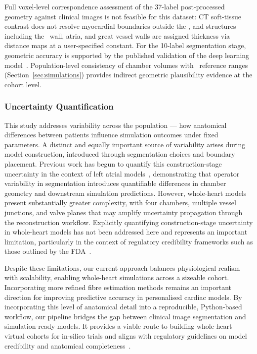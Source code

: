 Full voxel-level correspondence assessment of the 37-label post-processed 
geometry against clinical images is not feasible for this dataset: CT 
soft-tissue contrast does not resolve myocardial boundaries outside the \LV, 
and structures including the \RV\ wall, atria, and great vessel walls are 
assigned thickness via distance maps at a user-specified constant. 
For the 10-label segmentation stage, geometric accuracy is supported by the 
published validation of the deep learning model~\cite{hao2021_ccta}. 
Population-level consistency of chamber volumes with \UKBB\ reference 
ranges (Section~\ref{sec:simulations}) provides indirect geometric 
plausibility evidence at the cohort level.

\subsubsection{Uncertainty Quantification}\label{sec:uq}
This study addresses variability across the population — how anatomical 
differences between patients influence simulation outcomes under fixed 
parameters. A distinct and equally important source of variability arises 
during model construction, introduced through segmentation choices and 
boundary placement. Previous work has begun to quantify this 
construction-stage uncertainty in the context of left atrial 
models~\cite{solis-lemus2023_reproducibility, sim2019reproducibility}, 
demonstrating that operator variability in segmentation introduces 
quantifiable differences in chamber geometry and downstream simulation 
predictions. However, whole-heart models present substantially greater 
complexity, with four chambers, multiple vessel junctions, and valve planes 
that may amplify uncertainty propagation through the reconstruction workflow. 
Explicitly quantifying construction-stage uncertainty in whole-heart models 
has not been addressed here and represents an important limitation, 
particularly in the context of regulatory credibility frameworks such as 
those outlined by the FDA~\cite{health_assessing_2023}.

Despite these limitations, our current approach balances physiological realism with scalability, 
enabling whole-heart simulations across a sizeable cohort. 
Incorporating more refined fibre estimation methods remains an important direction for improving 
predictive accuracy in personalised cardiac models.
By incorporating this level of anatomical detail into a reproducible, Python-based workflow, 
our pipeline bridges the gap between clinical image segmentation and simulation-ready models. 
It provides a viable route to building whole-heart virtual cohorts for in-silico trials and 
aligns with regulatory guidelines on model credibility and anatomical completeness~\cite{fda2023_web}.

